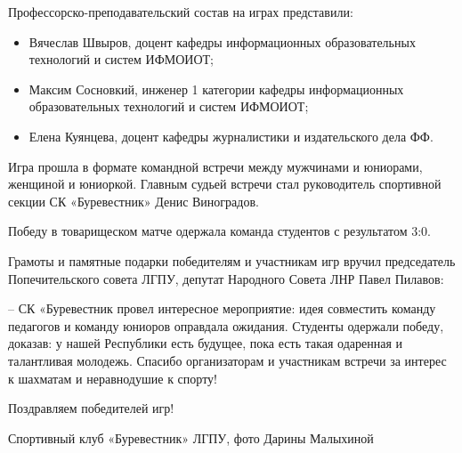 
Профессорско-преподавательский состав на играх представили:

\begin{itemize} %
\item Вячеслав Швыров, доцент кафедры информационных образовательных технологий и систем ИФМОИОТ;
\item Максим Сосновкий, инженер 1 категории кафедры информационных образовательных технологий и систем ИФМОИОТ;
\item Елена Куянцева, доцент кафедры журналистики и издательского дела ФФ.
\end{itemize} %

Игра прошла в формате командной встречи между мужчинами и юниорами, женщиной и
юниоркой. Главным судьей встречи стал руководитель спортивной секции СК
«Буревестник» Денис Виноградов.

Победу в товарищеском матче одержала команда студентов с результатом 3:0.

Грамоты и памятные подарки победителям и участникам игр вручил председатель
Попечительского совета ЛГПУ, депутат Народного Совета ЛНР Павел Пилавов:

\begin{zznagolos}
– СК «Буревестник провел интересное мероприятие: идея совместить команду
педагогов и команду юниоров оправдала ожидания. Студенты одержали победу,
доказав: у нашей Республики есть будущее, пока есть такая одаренная и
талантливая молодежь. Спасибо организаторам и участникам встречи за интерес к
шахматам и неравнодушие к спорту!
\end{zznagolos}

Поздравляем победителей игр!

Спортивный клуб «Буревестник» ЛГПУ, фото Дарины Малыхиной
